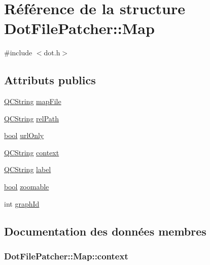\hypertarget{struct_dot_file_patcher_1_1_map}{}\section{Référence de la structure Dot\+File\+Patcher\+:\+:Map}
\label{struct_dot_file_patcher_1_1_map}


{\ttfamily \#include $<$dot.\+h$>$}

\subsection*{Attributs publics}
\begin{DoxyCompactItemize}
\item 
\hyperlink{class_q_c_string}{Q\+C\+String} \hyperlink{struct_dot_file_patcher_1_1_map_aec1d56210a55b5bae168f4492d786b6a}{map\+File}
\item 
\hyperlink{class_q_c_string}{Q\+C\+String} \hyperlink{struct_dot_file_patcher_1_1_map_a1039cf6923ea60a919d092990d86bb07}{rel\+Path}
\item 
\hyperlink{qglobal_8h_a1062901a7428fdd9c7f180f5e01ea056}{bool} \hyperlink{struct_dot_file_patcher_1_1_map_a4e0032ccbfd53bb27adc4d0252da9a6f}{url\+Only}
\item 
\hyperlink{class_q_c_string}{Q\+C\+String} \hyperlink{struct_dot_file_patcher_1_1_map_acd850ca81fb232e7b253746937702e66}{context}
\item 
\hyperlink{class_q_c_string}{Q\+C\+String} \hyperlink{struct_dot_file_patcher_1_1_map_a7aa1ae8828fec8377ddf808132a52f24}{label}
\item 
\hyperlink{qglobal_8h_a1062901a7428fdd9c7f180f5e01ea056}{bool} \hyperlink{struct_dot_file_patcher_1_1_map_a8e657340f36c6d423a2c0d1e417b3407}{zoomable}
\item 
int \hyperlink{struct_dot_file_patcher_1_1_map_a1bf5d3f2543719b345339e1ec307f24e}{graph\+Id}
\end{DoxyCompactItemize}


\subsection{Documentation des données membres}
\hypertarget{struct_dot_file_patcher_1_1_map_acd850ca81fb232e7b253746937702e66}{}
\subsubsection[{context}]{ Dot\+File\+Patcher\+::\+Map\+::context}\label{struct_dot_file_patcher_1_1_map_acd850ca81fb232e7b253746937702e66}
\hypertarget{struct_dot_file_patcher_1_1_map_a1bf5d3f2543719b345339e1ec307f24e}{}
